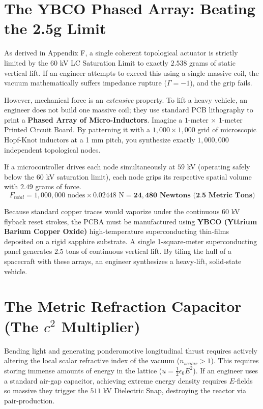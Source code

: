 \section{The YBCO Phased Array: Beating the 2.5g Limit}
As derived in Appendix F, a single coherent topological actuator is strictly limited by the $60$ kV LC Saturation Limit to exactly $2.538$ grams of static vertical lift. If an engineer attempts to exceed this using a single massive coil, the vacuum mathematically suffers impedance rupture ($\Gamma = -1$), and the grip fails.

However, mechanical force is an \textit{extensive} property. To lift a heavy vehicle, an engineer does not build one massive coil; they use standard PCB lithography to print a \textbf{Phased Array of Micro-Inductors}.
Imagine a $1$-meter $\times$ $1$-meter Printed Circuit Board. By patterning it with a $1,000 \times 1,000$ grid of microscopic Hopf-Knot inductors at a 1 mm pitch, you synthesize exactly $1,000,000$ independent topological nodes. 

If a microcontroller drives each node simultaneously at $59$ kV (operating safely below the $60$ kV saturation limit), each node grips its respective spatial volume with $2.49$ grams of force. 
\begin{equation}
    F_{total} = 1,000,000 \text{ nodes} \times 0.02448 \text{ N} = \mathbf{24,480 \text{ Newtons (2.5 Metric Tons)}}
\end{equation}

Because standard copper traces would vaporize under the continuous $60$ kV flyback reset strokes, the PCBA must be manufactured using \textbf{YBCO (Yttrium Barium Copper Oxide)} high-temperature superconducting thin-films deposited on a rigid sapphire substrate. A single 1-square-meter superconducting panel generates 2.5 tons of continuous vertical lift. By tiling the hull of a spacecraft with these arrays, an engineer synthesizes a heavy-lift, solid-state vehicle.

\section{The Metric Refraction Capacitor (The $c^2$ Multiplier)}
Bending light and generating ponderomotive longitudinal thrust requires actively altering the local scalar refractive index of the vacuum ($n_{scalar} > 1$). This requires storing immense amounts of energy in the lattice ($u = \frac{1}{2} \epsilon_0 E^2$). If an engineer uses a standard air-gap capacitor, achieving extreme energy density requires $E$-fields so massive they trigger the $511$ kV Dielectric Snap, destroying the reactor via pair-production.

